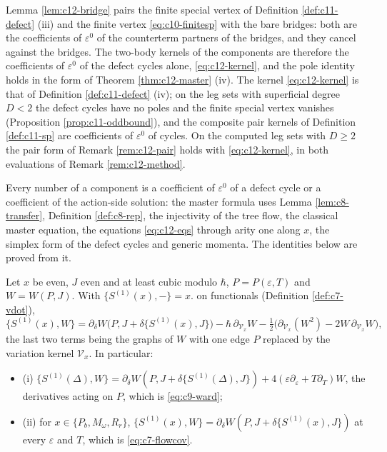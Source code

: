 \begin{remark}
\label{rem:c12-finitesp}
Lemma \ref{lem:c12-bridge} pairs the finite special vertex of Definition \ref{def:c11-defect} (iii) and the finite vertex \eqref{eq:c10-finitesp} with the bare bridges: both are the coefficients of $\varepsilon^0$ of the counterterm partners of the bridges, and they cancel against the bridges. The two-body kernels of the components are therefore the coefficients of $\varepsilon^0$ of the defect cycles alone, \eqref{eq:c12-kernel}, and the pole identity holds in the form of Theorem \ref{thm:c12-master} (iv). The kernel \eqref{eq:c12-kernel} is that of Definition \ref{def:c11-defect} (iv); on the leg sets with superficial degree $D<2$ the defect cycles have no poles and the finite special vertex vanishes (Proposition \ref{prop:c11-oddbound}), and the composite pair kernels of Definition \ref{def:c11-sp} are coefficients of $\varepsilon^0$ of cycles. On the computed leg sets with $D\ge2$ the pair form of Remark \ref{rem:c12-pair} holds with \eqref{eq:c12-kernel}, in both evaluations of Remark \ref{rem:c12-method}.
\end{remark}

Every number of a component is a coefficient of $\varepsilon^0$ of a defect cycle or a coefficient of the action-side solution: the master formula uses Lemma \ref{lem:c8-transfer}, Definition \ref{def:c8-rep}, the injectivity of the tree flow, the classical master equation, the equations \eqref{eq:c12-eqs} through arity one along $x$, the simplex form of the defect cycles and generic momenta. The identities below are proved from it.

\begin{theorem}
\label{thm:c12-ward}
Let $x$ be even, $J$ even and at least cubic modulo $\hbar$, $P=P(\varepsilon,T)$ and $W=W(P,J)$. With $\{S^{(1)}(x),-\}=x.$ on functionals (Definition \ref{def:c7-vdot}),
\begin{equation}
\{S^{(1)}(x),W\}=\partial_\delta W\big(P,J+\delta\{S^{(1)}(x),J\}\big)-\hbar\,\partial_{\mathcal V_x}W-\tfrac12\big(\partial_{\mathcal V_x}(W^2)-2W\,\partial_{\mathcal V_x}W\big),
\label{eq:c12-ward}
\end{equation}
the last two terms being the graphs of $W$ with one edge $P$ replaced by the variation kernel $\mathcal V_x$. In particular:
\begin{itemize}
\item (i) $\{S^{(1)}(\Delta),W\}=\partial_\delta W(P,J+\delta\{S^{(1)}(\Delta),J\})+4(\varepsilon\partial_\varepsilon+T\partial_T)W$, the derivatives acting on $P$, which is \eqref{eq:c9-ward};
\item (ii) for $x\in\{P_b,M_\omega,R_r\}$, $\{S^{(1)}(x),W\}=\partial_\delta W(P,J+\delta\{S^{(1)}(x),J\})$ at every $\varepsilon$ and $T$, which is \eqref{eq:c7-flowcov}.
\end{itemize}
\end{theorem}

